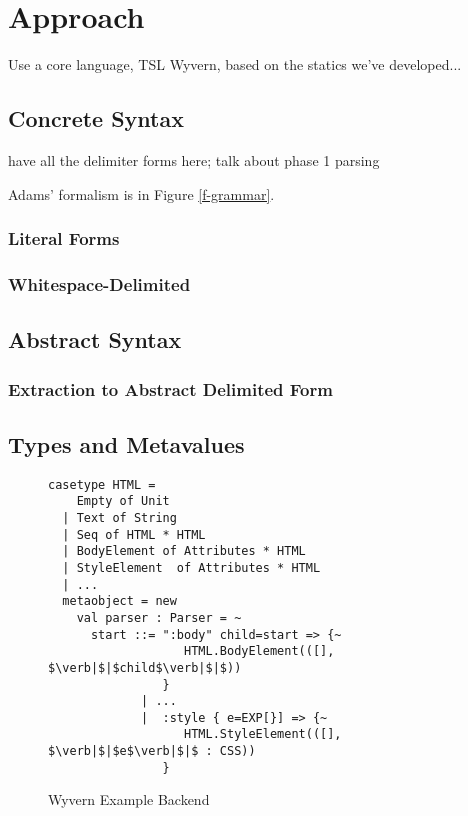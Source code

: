 \section{Approach}
\label{s:approach}
Use a core language, TSL Wyvern, based on the statics we've developed...


\subsection{Concrete Syntax}
have all the delimiter forms here; talk about phase 1 parsing

Adams' formalism is in Figure \ref{f-grammar}.


\subsubsection{Literal Forms}
\subsubsection{Whitespace-Delimited}

\subsection{Abstract Syntax}
\subsubsection{Extraction to Abstract Delimited Form}

\subsection{Types and Metavalues}


\begin{figure}
\begin{lstlisting}[escapechar=$]
casetype HTML = 
    Empty of Unit
  | Text of String
  | Seq of HTML * HTML 
  | BodyElement of Attributes * HTML
  | StyleElement  of Attributes * HTML
  | ...
  metaobject = new
    val parser : Parser = ~
      start ::= ":body" child=start => {~ 
                   HTML.BodyElement(([], $\verb|$|$child$\verb|$|$))
                } 
             | ...
             |  :style { e=EXP[}] => {~
                   HTML.StyleElement(([], $\verb|$|$e$\verb|$|$ : CSS))
                }
\end{lstlisting}
\caption{Wyvern Example Backend}
\label{f-htmltype}
\end{figure}

